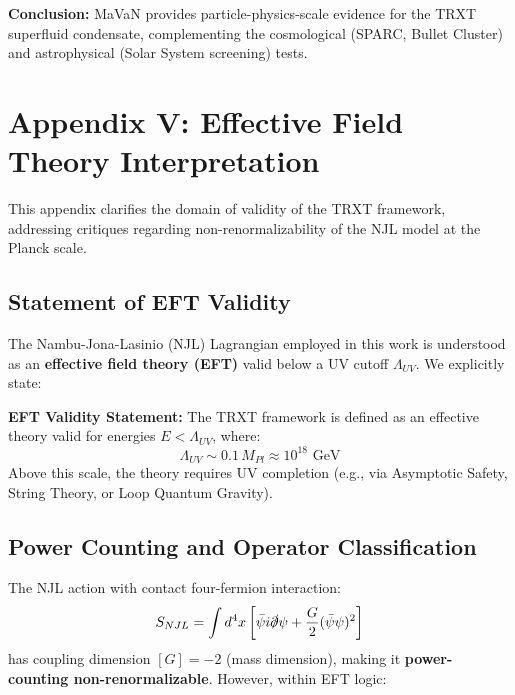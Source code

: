 \documentclass[a4paper,12pt]{article}
\begin{document}
\textbf{Conclusion:} MaVaN provides particle-physics-scale evidence for the TRXT superfluid condensate, complementing the cosmological (SPARC, Bullet Cluster) and astrophysical (Solar System screening) tests.

\section{Appendix V: Effective Field Theory Interpretation}

This appendix clarifies the domain of validity of the TRXT framework, addressing critiques regarding non-renormalizability of the NJL model at the Planck scale.

\subsection{Statement of EFT Validity}

The Nambu-Jona-Lasinio (NJL) Lagrangian employed in this work is understood as an \textbf{effective field theory (EFT)} valid below a UV cutoff $\Lambda_{UV}$. We explicitly state:

\begin{mdframed}[backgroundcolor=yellow!10]
\textbf{EFT Validity Statement:} The TRXT framework is defined as an effective theory valid for energies $E < \Lambda_{UV}$, where:
\begin{equation}
    \Lambda_{UV} \sim 0.1 \, M_{Pl} \approx 10^{18} \text{ GeV}
\end{equation}
Above this scale, the theory requires UV completion (e.g., via Asymptotic Safety, String Theory, or Loop Quantum Gravity).
\end{mdframed}

\subsection{Power Counting and Operator Classification}

The NJL action with contact four-fermion interaction:
\begin{equation}
    S_{NJL} = \int d^4x \left[ \bar{\psi} i \slashed{\partial} \psi + \frac{G}{2} (\bar{\psi}\psi)^2 \right]
\end{equation}
has coupling dimension $[G] = -2$ (mass dimension), making it \textbf{power-counting non-renormalizable}. However, within EFT logic:
\end{document}
